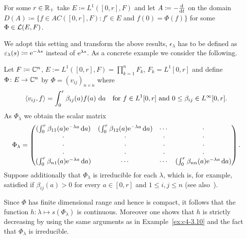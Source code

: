 For some $r \in \mathbb{R}_{+}$ take $E \coloneq L^{1}([0,r], F)$ and let $A \coloneq - \frac{\mathop{}\!\mathrm{d}{}}{\mathop{}\!\mathrm{d}{t}}$ on the domain $D(A) \coloneq \{f \in AC([0,r], F) \colon f' \in E$ and $f(0) = \Phi(f)\}$ for some $\Phi \in \mathcal{L}(E,F)$.

We adopt this setting and transform the above results, \eg $\epsilon_{\lambda}$ has to be defined as $\epsilon_{\lambda}(s) \coloneq \eu^{-\lambda s}$ instead of\/ $\mathrm{e}^{\lambda s}$.
As a concrete example we consider the following.


\begin{example}\label{ex:c4-3.12}
%
%
Let $F \coloneq \mathbb{C}^{n}$, $E:= L^{1}([0,r],F) = \prod_{k=1}^{n} F_{k}$, $F_{k} = L^{1}[0,r]$ and define $\Phi \colon E \to \mathbb{C}^{n}$ by $\Phi = (v_{ij})_{{n\times n}}$ where
\[
\langle v_{ij}, f \rangle = \int_{0}^{r} \beta_{ij}(a)f(a) \, \diff{a} \quad \text{for } f \in L^{1}[0,r] \text{ and } 0 \leq \beta_{ij} \in L^{\infty}[0,r]  .
\]
As $\Phi_{\lambda}$ we obtain the scalar matrix
\begin{equation*}\label{eq:c4-3.12-kgk2}
\Phi_{\lambda} = \begin{pmatrix}
(\int_0^r \beta_{11}(a)\mathrm{e}^{-\lambda a}\mathop{}\!\mathrm{d}{a}) & (\int_0^r \beta_{12}(a)\mathrm{e}^{-\lambda a}\mathop{}\!\mathrm{d}{a}) & \cdots & \cdot \\
\cdot & \cdot & \cdot & \cdot \\
\cdot & \cdot & \cdot & \cdot \\
\cdot & \cdot & \cdot & \cdot \\
(\int_0^r \beta_{n1}(a)\mathrm{e}^{-\lambda a}\mathop{}\!\mathrm{d}{a}) & \cdots & \cdots & (\int_0^r \beta_{nn}(a)\mathrm{e}^{-\lambda a}\mathop{}\!\mathrm{d}{a})
\end{pmatrix} . 
\end{equation*}
Suppose additionally that $\Phi_{\lambda}$ is irreducible for each $\lambda$, which is, for example, satisfied if\/ $\beta_{ij}(a) > 0$ for every $a \in [0,r]$ and $1 \leq i,j \leq n$ (see also \textcite[p.257ff]{bellmancooke:1963}\,).

Since $\Phi$ has finite dimensional range and hence is compact, it follows that the function $h \colon \lambda \mapsto s(\Phi_{\lambda})$ is continuous.
Moreover one shows that $h$ is strictly decreasing by using the same arguments as in Example~\ref{ex:c4-3.10} and the fact that $\Phi_{\lambda}$ is irreducible.


\end{example}
